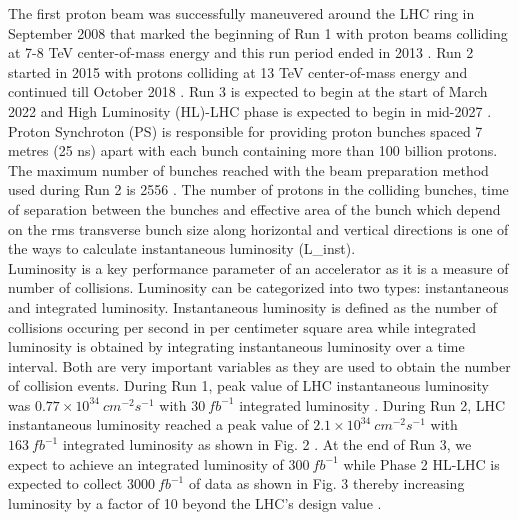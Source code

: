 The first proton beam was successfully maneuvered around the LHC ring in September 2008 that marked the beginning of Run 1 with proton beams colliding at 7-8 TeV center-of-mass energy and this run period ended in 2013 \cite{cmsrun} \cite{Alemany-Fernandez:1631030}. Run 2 started in 2015 with protons colliding at 13 TeV center-of-mass energy and continued till October 2018 \cite{Wenninger:2668326}. Run 3 is expected to begin at the start of March 2022 and High Luminosity (HL)-LHC phase is expected to begin in mid-2027 \cite{Dainese:2019rgk}. Proton Synchroton (PS) is responsible for providing proton bunches spaced 7 metres (25 ns) apart with each bunch containing more than 100 billion protons. The maximum number of bunches reached with the beam preparation method used during Run 2 is 2556 \cite{Wenninger:2668326}. The number of protons in the colliding bunches, time of separation between the bunches and effective area of the bunch which depend on the rms transverse bunch size along horizontal and vertical directions is one of the ways to calculate instantaneous luminosity (L_{inst}). \\

Luminosity is a key performance parameter of an accelerator as it is a measure of number of collisions. Luminosity can be categorized into two types: instantaneous and integrated luminosity. Instantaneous luminosity is defined as the number of collisions occuring per second in per centimeter square area while integrated luminosity is obtained by integrating instantaneous luminosity over a time interval. Both are very important variables as they are used to obtain the number of collision events. During Run 1, peak value of LHC instantaneous luminosity was $0.77 \times 10^{34} \: cm^{-2} s^{-1} $ with $30 \: fb^{-1}$ integrated luminosity \cite{cmsrun1lumi}. During Run 2, LHC instantaneous luminosity reached a peak value of $2.1 \times 10^{34}  \: cm^{-2} s^{-1}$ with $163 \: fb^{-1}$ integrated luminosity as shown in Fig. 2 \cite{CMS:2018elu}. At the end of Run 3, we expect to achieve an integrated luminosity  of $300 \:fb^{-1}$ while Phase 2 HL-LHC is expected to collect $3000 \:fb^{-1}$ of data as shown in Fig. 3 thereby increasing luminosity by a factor of 10 beyond the LHC's design value \cite{Dainese:2019rgk}. \\


